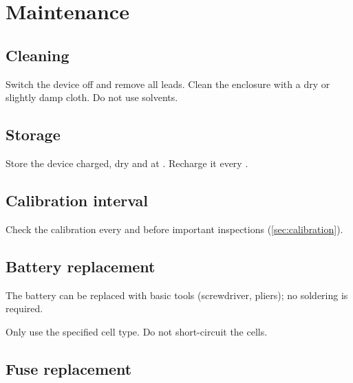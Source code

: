 \section{Maintenance}
\label{sec:maintenance}

\subsection{Cleaning}
Switch the device off and remove all leads. Clean the enclosure with a dry or slightly damp cloth.
Do not use solvents.

\subsection{Storage}
Store the device charged, dry and at . Recharge it every .

\subsection{Calibration interval}
Check the calibration every  and before important inspections (\autoref{sec:calibration}).

\subsection{Battery replacement}
The battery can be replaced with basic tools (screwdriver, pliers); no soldering is required.
\begin{warning}
    Only use the specified cell type. Do not short-circuit the cells.
\end{warning}

\subsection{Fuse replacement}

